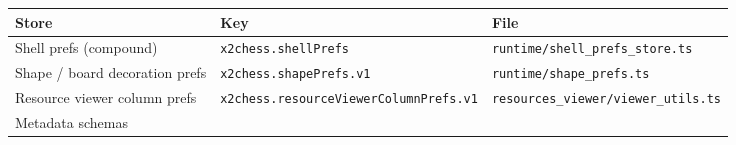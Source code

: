 \documentclass[]{article}
\begin{document}
\begin{longtable}[]{@{}lll@{}}
\toprule
\begin{minipage}[b]{0.05\columnwidth}\raggedright\strut
Store\strut
\end{minipage} & \begin{minipage}[b]{0.05\columnwidth}\raggedright\strut
Key\strut
\end{minipage} & \begin{minipage}[b]{0.05\columnwidth}\raggedright\strut
File\strut
\end{minipage}\tabularnewline
\midrule
\endhead
\begin{minipage}[t]{0.05\columnwidth}\raggedright\strut
Shell prefs (compound)\strut
\end{minipage} & \begin{minipage}[t]{0.05\columnwidth}\raggedright\strut
\texttt{x2chess.shellPrefs}\strut
\end{minipage} & \begin{minipage}[t]{0.05\columnwidth}\raggedright\strut
\texttt{runtime/shell\_prefs\_store.ts}\strut
\end{minipage}\tabularnewline
\begin{minipage}[t]{0.05\columnwidth}\raggedright\strut
Shape / board decoration prefs\strut
\end{minipage} & \begin{minipage}[t]{0.05\columnwidth}\raggedright\strut
\texttt{x2chess.shapePrefs.v1}\strut
\end{minipage} & \begin{minipage}[t]{0.05\columnwidth}\raggedright\strut
\texttt{runtime/shape\_prefs.ts}\strut
\end{minipage}\tabularnewline
\begin{minipage}[t]{0.05\columnwidth}\raggedright\strut
Resource viewer column prefs\strut
\end{minipage} & \begin{minipage}[t]{0.05\columnwidth}\raggedright\strut
\texttt{x2chess.resourceViewerColumnPrefs.v1}\strut
\end{minipage} & \begin{minipage}[t]{0.05\columnwidth}\raggedright\strut
\texttt{resources\_viewer/viewer\_utils.ts}\strut
\end{minipage}\tabularnewline
\begin{minipage}[t]{0.05\columnwidth}\raggedright\strut
Metadata schemas\strut
\end{minipage} & \begin{minipage}[t]{0.05\columnwidth}\raggedright\strut

\end{minipage}
\end{longtable}
\end{document}
